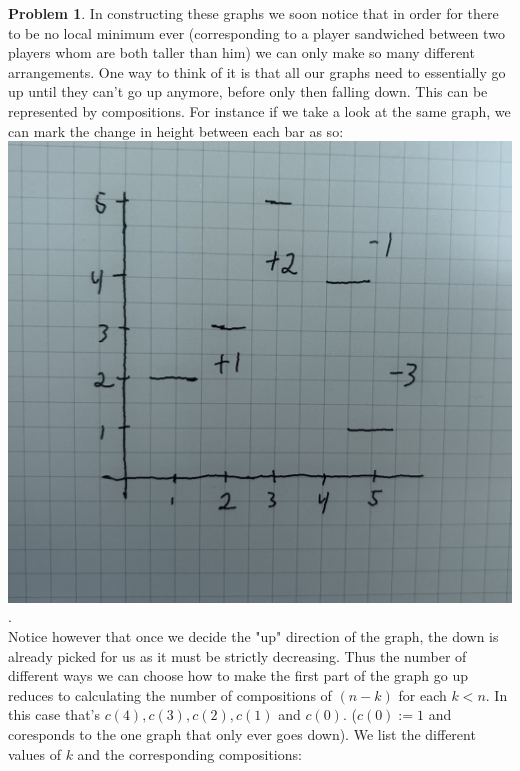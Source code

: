 \documentclass{article}
\theoremstyle{definition}
\newtheorem{problem}{Problem}
\begin{document}
\begin{problem}
In constructing these graphs we soon notice that in order for there to be no local minimum ever (corresponding to a player sandwiched between two players whom are both taller than him)
we can only make so many different arrangements. One way to think of it is that all our graphs need to essentially go up until they can't go up anymore, before only then falling down. This can be represented by compositions. For instance if we take a look at the same graph,
we can mark the change in height between each bar as so:
\includegraphics[scale = 0.1]{./Figures/IMG_0479.jpg}.\\

Notice however that once we decide the "up" direction of the graph, the down is already picked for us as it must be strictly decreasing. Thus the number of different ways
we can choose how to make the first part of the graph go up reduces to calculating the number of compositions of $(n-k)$ for each $k<n$. In this case that's $c(4),c(3),c(2),c(1)$ and $c(0)$. ($c(0):=1$ and coresponds to the one graph that only ever goes down).
We list the different values of $k$ and the corresponding compositions:\\


\end{problem}
\end{document}

